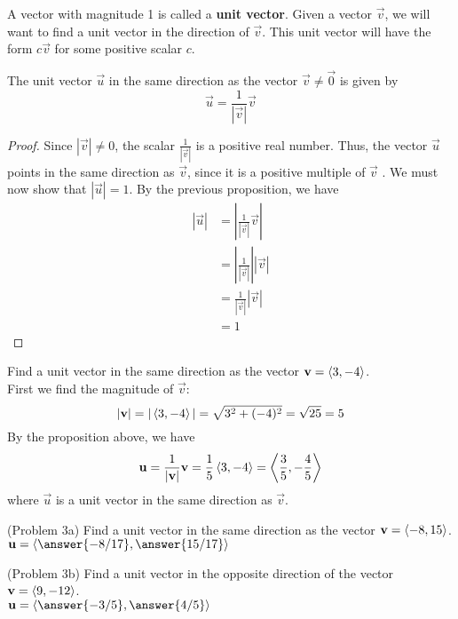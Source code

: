 \documentclass[handout]{ximera}
\begin{document}
A vector with magnitude 1 is called a {\bf unit vector}. Given a vector $\vec{v}$, we will want to find a unit vector in the direction of $\vec{v}$.
This unit vector will have the form $c\vec{v}$ for some positive scalar $c$.  
\begin{proposition}
The unit vector $\vec{u}$ in the same direction as the vector $\vec{v} \neq \vec{0}$ is given by 
\[
\vec{u} = \frac{1}{|\vec{v}|} \vec{v}
\]
\begin{proof}
Since $|\vec{v}| \neq 0$, the scalar $\displaystyle \frac{1}{|\vec{v}|}$ is a positive real number.  Thus, the vector $\vec{u}$ points 
in the same direction as $\vec{v}$, since it is a positive multiple of $\vec{v}$ . We must now show that $|\vec{u}| = 1$.  
By the previous proposition, we have
\begin{align*}
|\vec{u}| &= \left| \frac{1}{|\vec{v}|} \vec{v} \right|\\
           &= \left| \frac{1}{|\vec{v}|} \right| |\vec{v}|\\
           &= \frac{1}{|\vec{v}|} |\vec{v}|\\
           &= 1
\end{align*}
\end{proof}
\end{proposition}

\begin{example}[Example 3]
Find a unit vector in the same direction as the vector $\mathbf{v} = \left\langle 3, -4\right\rangle$.\\
First we find the magnitude of $\vec{v}$:
\[
|\mathbf{v}| = |\left\langle 3, -4\right\rangle| = \sqrt{3^2 + (-4)^2} = \sqrt{25} = 5
\]
By the proposition above, we have
\[
\mathbf{u} = \frac{1}{|\mathbf{v}|} \mathbf{v} = \frac15 \left\langle 3, -4\right\rangle = \left\langle \frac35, -\frac45\right\rangle
\]
where $\vec{u}$ is a unit vector in the same direction as $\vec{v}$.
\end{example}

\begin{problem}(Problem 3a)
Find a unit vector in the same direction as the vector $\mathbf{v} = \left\langle -8, 15\right\rangle$.\\
$\vec{u} = \vector{\answer{-8/17}, \answer{15/17}}$
\end{problem}

\begin{problem}(Problem 3b)
Find a unit vector in the opposite direction of the vector $\mathbf{v} = \left\langle 9, -12\right\rangle$.\\
$\vec{u} = \vector{\answer{-3/5}, \answer{4/5}}$
\end{problem}
\end{document}
